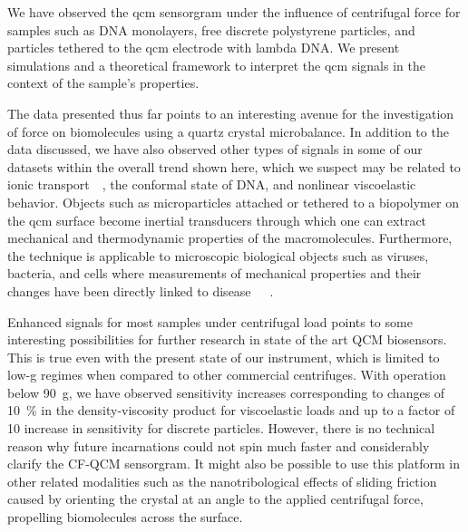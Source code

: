 We have observed the \gls{qcm} sensorgram under the influence of centrifugal force
for samples such as DNA monolayers, free discrete polystyrene particles, and
particles tethered to the \gls{qcm} electrode with lambda DNA\@.  We present
simulations and a theoretical framework to interpret the \gls{qcm} signals in the
context of the sample's properties.

The data presented thus far points to an interesting avenue for the
investigation of force on biomolecules using a quartz crystal microbalance.  In
addition to the data discussed, we have also observed other types of signals in
some of our datasets within the overall trend shown here, which we suspect may
be related to ionic
transport~\cite{tolman1911electromotive}~\cite{des1893unpolarisirbare}, the
conformal state of DNA, and nonlinear viscoelastic behavior.  Objects such as
microparticles attached or tethered to a biopolymer on the \gls{qcm} surface become
inertial transducers through which one can extract mechanical and thermodynamic
properties of the macromolecules. Furthermore, the technique is applicable to
microscopic biological objects such as viruses, bacteria, and cells where
measurements of mechanical properties and their changes have been directly
linked to
disease~\cite{merkel1989molecular}~\cite{yeri2009mutation}~\cite{tevet2011friction}.

Enhanced signals for most samples under centrifugal load points to some
interesting possibilities for further research in state of the art QCM
biosensors.  This is true even with the present state of our instrument, which
is limited to low-g regimes when compared to other commercial centrifuges. With
operation below \SI{90}{g}, we have observed sensitivity increases
corresponding to changes of \SI{10}{\percent} in the density-viscosity product
for viscoelastic loads and up to a factor of 10 increase in sensitivity for
discrete particles.  However, there is no technical reason why future
incarnations could not spin much faster and considerably clarify the CF-QCM
sensorgram.  It might also be possible to use this platform in other related
modalities such as the nanotribological effects of sliding
friction~\cite{krim1991nanotribology} caused by orienting the crystal at an
angle to the applied centrifugal force, propelling biomolecules across the
surface.

